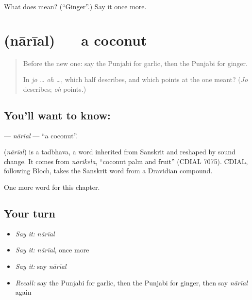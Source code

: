 \begin{tcolorbox}[breakable,colback=teal!4,colframe=teal!35!black,title={Before you move on}]
What does  mean? (\textquotedblleft{}Ginger\textquotedblright{}.) Say it once more.
\end{tcolorbox}
\section[\texorpdfstring{\pa{ਨਾਰੀਅਲ} (nārīal)}{ਨਾਰੀਅਲ (nārīal)}]{ (nārīal) — a coconut}

\label{lesson:PA-C123-narial}



\begin{quote}
Before the new one: say the Punjabi for garlic, then the Punjabi for ginger.

In \emph{jo … oh …}, which half describes, and which points at the one meant? (\emph{Jo} describes; \emph{oh} points.)
\end{quote}

\subsection*{You'll want to know: }
\textbf{} — \emph{nārīal} — \textquotedblleft{}a coconut\textquotedblright{}.

\begin{cousinweb}
\textbf{} (\emph{nārīal}) is a tadbhava, a word inherited from Sanskrit and reshaped by sound change. It comes from \emph{nārikela}, \textquotedblleft{}coconut palm and fruit\textquotedblright{} (CDIAL 7075). CDIAL, following Bloch, takes the Sanskrit word from a Dravidian compound.
\end{cousinweb}

\begin{grammarlens}[title={What you've built}]
One more word for this chapter.
\end{grammarlens}

\subsection*{Your turn}
\begin{itemize}
\raggedright
  \item \emph{Say it:} \emph{nārīal}
  \item \emph{Say it:} \emph{nārīal}, once more
  \item \emph{Say it:} say \emph{nārīal}
  \item \emph{Recall:} say the Punjabi for garlic, then the Punjabi for ginger, then say \emph{nārīal} again
\end{itemize}

